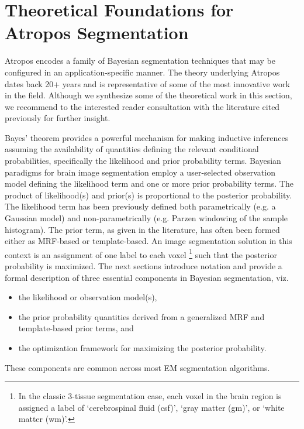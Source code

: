 \documentclass[11pt,english]{article}
\begin{document}
\section{Theoretical Foundations for Atropos Segmentation} 

Atropos encodes a family of Bayesian segmentation techniques that may be configured in an application-specific manner.  The theory underlying Atropos dates back 20$+$ years and is representative of some of the most innovative work in the field.  Although we synthesize some of the theoretical work in this section, we recommend to the interested reader consultation with the literature cited previously for further insight.

Bayes' theorem provides a powerful mechanism for making inductive
inferences assuming the availability of quantities defining the
relevant conditional probabilities, specifically the likelihood and
prior probability terms.  Bayesian paradigms for brain image
segmentation employ a user-selected observation model defining the
likelihood term and one or more prior probability terms.  The product
of likelihood(s) and prior(s) is proportional to the posterior
probability.  The likelihood term has been previously defined both 
parametrically (e.g. a Gaussian model) and non-parametrically
(e.g. Parzen windowing of the sample histogram).  The prior term, as
given in the literature, has often been formed either as
MRF-based or template-based.  An image segmentation solution in this
context is an assignment of one label to each voxel
\footnote{
In the classic 3-tissue segmentation case, each voxel in the brain region is assigned a label of `cerebrospinal fluid (csf)', `gray matter (gm)', or `white matter (wm)'. 
}
such that the posterior probability is maximized.  The next sections
introduce notation and provide a formal description of three essential
components in Bayesian segmentation, viz.
\begin{itemize}
  \item the likelihood or observation model(s),
  \item the prior probability quantities derived from a generalized
    MRF and template-based prior terms, and 
  \item the optimization framework for maximizing the posterior probability.
\end{itemize}
These components are common across most EM segmentation algorithms. 
\end{document}
